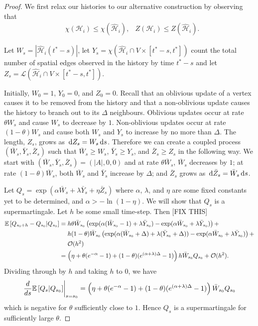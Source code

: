 \begin{proof}
	We first relax our histories to our alternative construction by observing that
	\begin{align}
		&\chi(\mathcal{H}_i) \leq \chi(\hat{\mathcal{H}}_i), &Z(\mathcal{H}_i) \leq Z(\hat{\mathcal{H}}_i).
	\end{align}


	Let $W_s = |\hat{\mathcal{H}}_i (t^* - s)|$, let $Y_s = \chi(\hat{\mathcal{H}}_i \cap V \times [t^* - s, t^*])$ count the total number of spatial edges observed in the history by time $t^* - s$ and let $Z_s = \mathcal{L}(\hat{\mathcal{H}}_i \cap V \times [t^* - s, t^*])$. 

	Initially, $W_0 = 1$, $Y_0 = 0$, and $Z_0 = 0$. Recall that an oblivious update of a vertex causes it to be removed from the history and that a non-oblivious update causes the history to branch out to its $\Delta$ neighbours. Oblivious updates occur at rate $\theta W_s$ and cause $W_s$ to decrease by $1$. Non-oblivious updates occur at rate $(1 - \theta)W_s$ and cause both $W_s$ and $Y_s$ to increase by no more than $\Delta$. The length, $Z_s$, grows as $\, \mathrm{d} Z_s = W_s \, \mathrm{d} s$. Therefore we can create a coupled process $(\bar{W}_s, \bar{Y}_s, \bar{Z}_s)$ such that $\bar{W}_s \geq W_s$, $\bar{Y}_s \geq Y_s$, and $\bar{Z}_s \geq Z_s$ in the following way. We start with $(\bar{W}_s, \bar{Y}_s, \bar{Z}_s) = (|A|, 0, 0)$ and at rate $\theta \bar{W}_s$, $\bar{W}_s$ decreases by $1$; at rate $(1 - \theta)\bar{W}_s$, both $\bar{W}_s$ and $\bar{Y}_s$ increase by $\Delta$; and $\bar{Z}_s$ grows as $\, \mathrm{d} \bar{Z}_s = \bar{W}_s \, \mathrm{d} s$.

	Let $Q_s = \exp \left(\alpha \bar{W}_s + \lambda \bar{Y}_s + \eta \bar{Z}_s\right)$ where $\alpha$, $\lambda$, and $\eta$ are some fixed constants yet to be determined, and $\alpha > -\ln(1 - \eta)$. We will show that $Q_s$ is a supermartingale. Let $h$ be some small time-step. Then [FIX THIS]
	\begin{align}
		\mathbb{E}\left[Q_{s_0 + h} - Q_{s_0}| Q_{s_0}\right] &= h \theta \bar{W}_{s_0} \left(\exp(\alpha (\bar{W}_{s_0} - 1) + \lambda \bar{Y}_{s_0}) - \exp(\alpha \bar{W}_{s_0} + \lambda \bar{Y}_{s_0})\right) + \\
		&\hphantom{= .} h (1 - \theta) \bar{W}_{s_0} \left( \exp(\alpha (\bar{W}_{s_0} + \Delta) + \lambda (\bar{Y}_{s_0} + \Delta)) - \exp(\alpha \bar{W}_{s_0} + \lambda \bar{Y}_{s_0}) \right) + \notag\\
		&\hphantom{= .} \mathcal{O}(h^2) \notag\\
		&= \left(\eta + \theta (e^{-\alpha} - 1) + (1 - \theta)(e^{(\alpha + \lambda)\Delta} - 1)\right)h \bar{W}_{s_0} Q_{s_0} + \mathcal{O}(h^2).
	\end{align}
	Dividing through by $h$ and taking $h$ to $0$, we have
	\begin{equation}
		\left.\frac{d}{ds} \mathbb{E}\left[Q_{s} | Q_{s_0}\right] \right|_{s = s_0} = \left(\eta + \theta (e^{-\alpha} - 1) + (1 - \theta)(e^{(\alpha + \lambda)\Delta} - 1)\right)\bar{W}_{s_0} Q_{s_0}
	\end{equation}
	which is negative for $\theta$ sufficiently close to $1$. Hence $Q_s$ is a supermartingale for sufficiently large $\theta$.


\end{proof}
